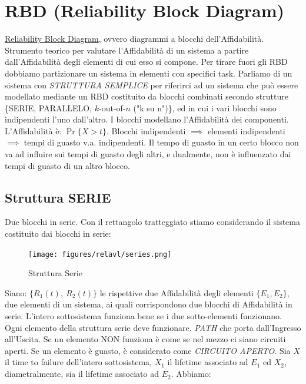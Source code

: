 \section{RBD (Reliability Block Diagram)}

\underline{Reliability Block Diagram}, ovvero diagrammi a blocchi dell'Affidabilità. Strumento teorico per valutare l'Affidabilità di un sistema a partire dall'Affidabilità degli elementi di cui esso si compone. Per tirare fuori gli RBD dobbiamo partizionare un sistema in elementi con specifici task. Parliamo di un sistema con \textit{STRUTTURA SEMPLICE} per riferirci ad un sistema che può essere modellato mediante un RBD costituito da blocchi combinati secondo strutture \{SERIE, PARALLELO, $k$-out-of-$n$ ("k su n")\}, ed in cui i vari blocchi sono indipendenti l'uno dall'altro. I blocchi modellano l'Affidabilità dei componenti. L'Affidabilità è: $\Pr\{X > t\}$. Blocchi indipendenti $\implies$ elementi indipendenti $\implies$ tempi di guasto v.a. indipendenti. Il tempo di guasto in un certo blocco non va ad influire sui tempi di guasto degli altri, e dualmente, non è influenzato dai tempi di guasto di un altro blocco.

\subsection{Struttura SERIE}

Due blocchi in serie. Con il rettangolo tratteggiato stiamo considerando il sistema costituito dai blocchi in serie:

\begin{center}
\begin{figure}[H]
\centering
\texttt{[image: figures/relavl/series.png]}
\caption{Struttura Serie}
\end{figure}
\end{center}

Siano: $\{R_1(t),\ R_2(t)\}$ le rispettive due Affidabilità degli elementi $\{E_1,E_2\}$, due elementi di un sistema, ai quali corrispondono due blocchi di Affidabilità in serie. L'intero sottosistema funziona bene se i due sotto-elementi funzionano. Ogni elemento della struttura serie deve funzionare. \textit{PATH} che porta dall'Ingresso all'Uscita. Se un elemento NON funziona è come se nel mezzo ci siano circuiti aperti. Se un elemento è guasto, è considerato come \textit{CIRCUITO APERTO}. Sia $X$ il time to failure dell'intero sottosistema, $X_1$ il lifetime associato ad $E_1$ ed $X_2$, diametralmente, sia il lifetime associato ad $E_2$. Abbiamo: 

